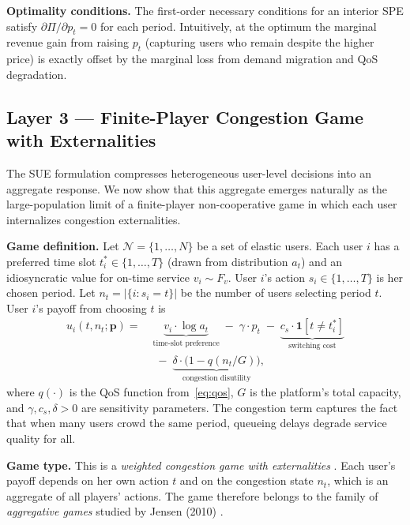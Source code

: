 \documentclass[11pt]{article}
\begin{document}
\textbf{Optimality conditions.} The first-order necessary conditions for
an interior SPE satisfy
$\partial\Pi/\partial p_t = 0$ for each period. Intuitively, at the optimum
the marginal revenue gain from raising $p_t$ (capturing users who remain
despite the higher price) is exactly offset by the marginal loss from
demand migration and QoS degradation.

\subsection{Layer 3 --- Finite-Player Congestion Game with Externalities}

The SUE formulation compresses heterogeneous user-level decisions into an
aggregate response. We now show that this aggregate emerges naturally as
the large-population limit of a finite-player non-cooperative game in
which each user internalizes congestion externalities.

\textbf{Game definition.} Let $\mathcal{N} = \{1,\dots,N\}$ be a set of
elastic users. Each user $i$ has a preferred time slot $t_i^*\in\{1,\dots,T\}$
(drawn from distribution $a_t$) and an idiosyncratic value for on-time service
$v_i \sim F_v$. User $i$'s action $s_i\in\{1,\dots,T\}$ is her chosen period.
Let $n_t = |\{i : s_i = t\}|$ be the number of users selecting period $t$.
User $i$'s payoff from choosing $t$ is
\begin{align}
  u_i(t, n_t; \boldsymbol{p}) = \;
  &\underbrace{v_i \cdot \log a_t}_{\text{time-slot preference}}
  \;-\; \gamma \cdot p_t
  \;-\; \underbrace{c_s \cdot \mathbf{1}[t \neq t_i^*]}_{\text{switching cost}}
  \nonumber\\
  &\;-\; \underbrace{\delta \cdot \bigl(1 - q(n_t/G)\bigr)}_{\text{congestion disutility}},
  \label{eq:player_payoff}
\end{align}
where $q(\cdot)$ is the QoS function from~\eqref{eq:qos}, $G$ is the
platform's total capacity, and $\gamma, c_s, \delta > 0$ are sensitivity
parameters. The congestion term captures the fact that when many users
crowd the same period, queueing delays degrade service quality for all.

\textbf{Game type.} This is a {\em weighted congestion game with
externalities} \cite{rosenthal1973class}. Each user's payoff depends on
her own action $t$ and on the congestion state $n_t$, which is an
aggregate of all players' actions. The game therefore belongs to the
family of {\em aggregative games} studied by Jensen (2010)
\cite{jensen2010aggregative}.
\end{document}
